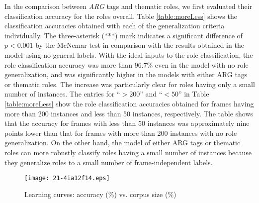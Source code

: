 \documentclass[english]{jnlp_1.4_rep}
\begin{document}
In the comparison between {\it ARG} tags and thematic roles, we first evaluated their classification accuracy for the roles overall. Table \ref{table:moreLess} shows the classification accuracies obtained with each of the generalization criteria individually. The three-asterisk (***) mark indicates a significant difference of $p < 0.001$ by the McNemar test in comparison with the results obtained in the model using no general labels. With the ideal inputs to the role classification, the role classification accuracy was more than 96.7\% even in the model with no role generalization, and was significantly higher in the models with either ARG tags or thematic roles. The increase was particularly clear for roles having only a small number of instances. The entries for ``$>200$'' and ``$<50$'' in Table \ref{table:moreLess} show the role classification accuracies obtained for frames having more than 200 instances and less than 50 instances, respectively. The table shows that the accuracy for frames with less than 50 instances was approximately nine points lower than that for frames with more than 200 instances with no role generalization. On the other hand, the model of either ARG tags or thematic roles can more robustly classify roles having a small number of instances because they generalize roles to a small number of frame-independent labels.

\begin{table}[b]
\begin{minipage}{168pt}
\setlength{\captionwidth}{168pt}
\label{table:moreLess}

\end{minipage}
\hfill
\begin{minipage}{240pt}
\setlength{\captionwidth}{240pt}
\label{table:argF1}

\end{minipage}
\end{table}
\begin{figure}[b]
\begin{center}
\texttt{[image: 21-4ia12f14.eps]}
\end{center}
\caption{Learning curves: accuracy (\%) vs. corpus size (\%)}
\label{fig:reduce}
\end{figure}
\end{document}

